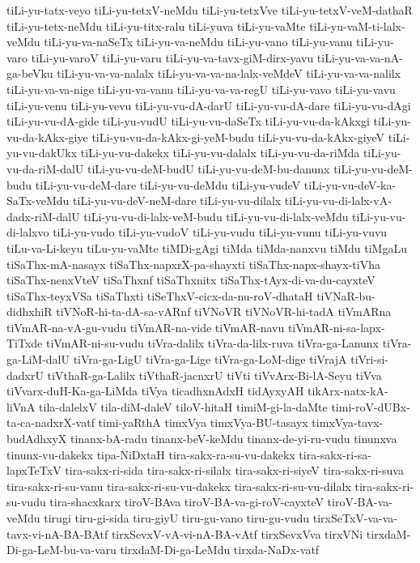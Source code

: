 {tiLi-yu-tatx-veyo
tiLi-yu-tetxV-neMdu
tiLi-yu-tetxVve
tiLi-yu-tetxV-veM-dathaR
tiLi-yu-tetx-neMdu
tiLi-yu-titx-ralu
tiLi-yuva
tiLi-yu-vaMte
tiLi-yu-vaM-ti-lalx-veMdu
tiLi-yu-va-naSeTx
tiLi-yu-va-neMdu
tiLi-yu-vano
tiLi-yu-vanu
tiLi-yu-varo
tiLi-yu-varoV
tiLi-yu-varu
tiLi-yu-va-tavx-giM-dirx-yavu
tiLi-yu-va-va-nA-ga-beVku
tiLi-yu-va-va-nalalx
tiLi-yu-va-va-na-lalx-veMdeV
tiLi-yu-va-va-nalilx
tiLi-yu-va-va-nige
tiLi-yu-va-vanu
tiLi-yu-va-va-regU
tiLi-yu-vavo
tiLi-yu-vavu
tiLi-yu-venu
tiLi-yu-vevu
tiLi-yu-vu-dA-darU
tiLi-yu-vu-dA-dare
tiLi-yu-vu-dAgi
tiLi-yu-vu-dA-gide
tiLi-yu-vudU
tiLi-yu-vu-daSeTx
tiLi-yu-vu-da-kAkxgi
tiLi-yu-vu-da-kAkx-giye
tiLi-yu-vu-da-kAkx-gi-yeM-budu
tiLi-yu-vu-da-kAkx-giyeV
tiLi-yu-vu-dakUkx
tiLi-yu-vu-dakekx
tiLi-yu-vu-dalalx
tiLi-yu-vu-da-riMda
tiLi-yu-vu-da-riM-dalU
tiLi-yu-vu-deM-budU
tiLi-yu-vu-deM-bu-danunx
tiLi-yu-vu-deM-budu
tiLi-yu-vu-deM-dare
tiLi-yu-vu-deMdu
tiLi-yu-vudeV
tiLi-yu-vu-deV-ka-SaTx-veMdu
tiLi-yu-vu-deV-neM-dare
tiLi-yu-vu-dilalx
tiLi-yu-vu-di-lalx-vA-dadx-riM-dalU
tiLi-yu-vu-di-lalx-veM-budu
tiLi-yu-vu-di-lalx-veMdu
tiLi-yu-vu-di-lalxvo
tiLi-yu-vudo
tiLi-yu-vudoV
tiLi-yu-vudu
tiLi-yu-vunu
tiLi-yu-vuvu
tiLu-va-Li-keyu
tiLu-yu-vaMte
tiMDi-gAgi
tiMda
tiMda-nanxvu
tiMdu
tiMgaLu
tiSaThx-mA-nasayx
tiSaThx-napxrX-pa-shayxti
tiSaThx-napx-shayx-tiVha
tiSaThx-nenxVteV
tiSaThxnf
tiSaThxnitx
tiSaThx-tAyx-di-va-du-cayxteV
tiSaThx-teyxVSa
tiSaThxti
tiSeThxV-cicx-da-nu-roV-dhataH
tiVNaR-bu-didhxhiR
tiVNoR-hi-ta-dA-sa-vARnf
tiVNoVR
tiVNoVR-hi-tadA
tiVmARna
tiVmAR-na-vA-gu-vudu
tiVmAR-na-vide
tiVmAR-navu
tiVmAR-ni-sa-lapx-TiTxde
tiVmAR-ni-su-vudu
tiVra-dalilx
tiVra-da-lilx-ruva
tiVra-ga-Lanunx
tiVra-ga-LiM-dalU
tiVra-ga-LigU
tiVra-ga-Lige
tiVra-ga-LoM-dige
tiVrajA
tiVri-si-dadxrU
tiVthaR-ga-Lalilx
tiVthaR-jacnxrU
tiVti
tiVvArx-Bi-lA-Seyu
tiVva
tiVvarx-duH-Ka-ga-LiMda
tiVya
ticadhxnAdxH
tidAyxyAH
tikArx-natx-kA-liVnA
tila-dalelxV
tila-diM-daleV
tiloV-hitaH
timiM-gi-la-daMte
timi-roV-dUBx-ta-ca-nadxrX-vatf
timi-yaRthA
timxVya
timxVya-BU-tasayx
timxVya-tavx-budAdhxyX
tinanx-bA-radu
tinanx-beV-keMdu
tinanx-de-yi-ru-vudu
tinunxva
tinunx-vu-dakekx
tipa-NiDxtaH
tira-sakx-ra-su-vu-dakekx
tira-sakx-ri-sa-lapxTeTxV
tira-sakx-ri-sida
tira-sakx-ri-silalx
tira-sakx-ri-siyeV
tira-sakx-ri-suva
tira-sakx-ri-su-vanu
tira-sakx-ri-su-vu-dakekx
tira-sakx-ri-su-vu-dilalx
tira-sakx-ri-su-vudu
tira-shacxkarx
tiroV-BAva
tiroV-BA-va-gi-roV-cayxteV
tiroV-BA-va-veMdu
tirugi
tiru-gi-sida
tiru-giyU
tiru-gu-vano
tiru-gu-vudu
tirxSeTxV-va-va-tavx-vi-nA-BA-BAtf
tirxSevxV-vA-vi-nA-BA-vAtf
tirxSevxVva
tirxVNi
tirxdaM-Di-ga-LeM-bu-va-varu
tirxdaM-Di-ga-LeMdu
tirxda-NaDx-vatf
}
